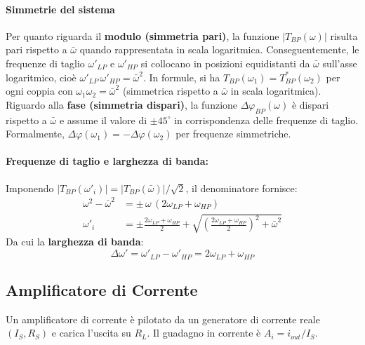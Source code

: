 \paragraph{Simmetrie del sistema}
Per quanto riguarda il \textbf{modulo (simmetria pari)}, la funzione $|T_{BP}(\omega)|$ risulta pari rispetto a $\bar{\omega}$ quando rappresentata in scala logaritmica. Conseguentemente, le frequenze di taglio $\omega'_{LP}$ e $\omega'_{HP}$ si collocano in posizioni equidistanti da $\bar{\omega}$ sull'asse logaritmico, cioè $\omega'_{LP}\,\omega'_{HP} = \bar\omega^2$. In formule, si ha $T_{BP}(\omega_1) = T_{BP}^*(\omega_2)$ per ogni coppia con $\omega_1\omega_2 = \bar\omega^2$ (simmetrica rispetto a $\bar{\omega}$ in scala logaritmica).
Riguardo alla \textbf{fase (simmetria dispari)}, la funzione $\Delta\varphi_{BP}(\omega)$ è dispari rispetto a $\bar{\omega}$ e assume il valore di $\pm 45^\circ$ in corrispondenza delle frequenze di taglio. Formalmente, $\Delta\varphi(\omega_1) = -\Delta\varphi(\omega_2)$ per frequenze simmetriche.

\paragraph{Frequenze di taglio e larghezza di banda:}
Imponendo $|T_{BP}(\omega'_i)| = |T_{BP}(\bar\omega)|/\sqrt{2}$, il denominatore fornisce:
\begin{align}
    \omega^2 - \bar{\omega}^2 &= \pm\,\omega\,(2\omega_{LP} + \omega_{HP}) \\
    \omega'_i &= \pm\frac{2\omega_{LP}+\omega_{HP}}{2}
               + \sqrt{\!\left(\frac{2\omega_{LP}+\omega_{HP}}{2}\right)^{\!2} + \bar{\omega}^2}
\end{align}
Da cui la \textbf{larghezza di banda}:
\begin{equation}
    \boxed{\Delta\omega' = \omega'_{LP} - \omega'_{HP} = 2\omega_{LP} + \omega_{HP}}
\end{equation}

\subsection{Amplificatore di Corrente}
Un amplificatore di corrente è pilotato da un generatore di corrente reale $(I_S, R_S)$ e carica l'uscita su $R_L$. Il guadagno in corrente è $A_i = i_{out}/I_S$.

